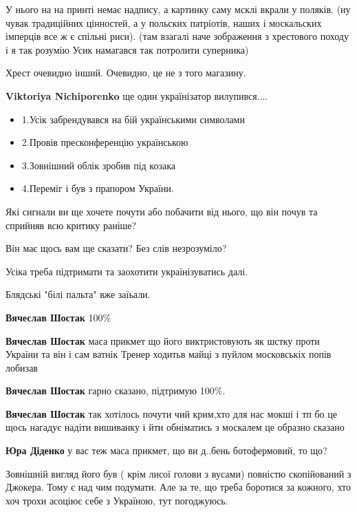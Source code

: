 \begin{itemize}
\begin{itemize}
У нього на на принті немає надпису, а картинку саму мсклі вкрали у поляків. (ну
чувак традиційних цінностей, а у польских патріотів, наших і москальских
імперців все ж є спільні риси). (там взагалі наче зображення з хрестового
походу і я так розумію Усик намагався так потролити суперника)


Хрест очевидно інший. Очевидно, це не з того магазину.

\textbf{Viktoriya Nichiporenko} ще один українізатор вилупився....

\end{itemize} %


\begin{itemize}
  \item 1.Усік забрендувався на бій українськими символами
  \item 2.Провів пресконференцію українською
  \item 3.Зовнішний облік зробив під козака
  \item 4.Переміг і був з прапором України.
\end{itemize}

Які сигнали ви ще хочете почути або побачити від нього, що він почув та
сприйняв всю критику раніше?

Він має щось вам ще сказати? Без слів незрозуміло?

Усіка треба підтримати та заохотити українізуватись далі.

Блядські "білі пальта" вже заїьали.

\begin{itemize} %
\textbf{Вячеслав Шостак} 100\%

\textbf{Вячеслав Шостак} маса прикмет що його виктристовують як шстку проти України та він і сам ватнік Тренер ходитьв майці з пуйлом московськіх попів лобизав

\textbf{Вячеслав Шостак} гарно сказано, підтримую 100\%.

\textbf{Вячеслав Шостак} так хотілось почути чий крим,хто для нас мокші і тп бо це щось нагадує надіти вишиванку і йти обніматись з москалем це образно сказано

\textbf{Юра Діденко} у вас теж маса прикмет, що ви д..бень ботофермовий, то що?


Зовнішній вигляд його був ( крім лисої голови з вусами) повністю скопійований з
Джокера. Тому є над чим подумати. Але за те, що треба боротися за кожного, хто
хоч трохи асоціює себе з Україною, тут погоджуюсь.



\end{itemize}
\end{itemize}
